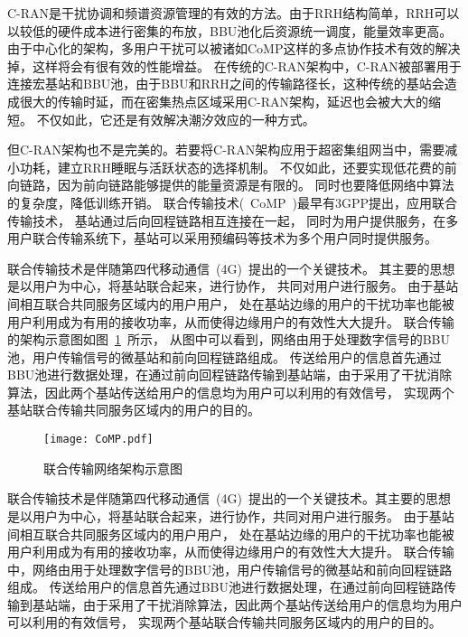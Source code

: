 C-RAN是干扰协调和频谱资源管理的有效的方法。由于RRH结构简单，RRH可以以较低的硬件成本进行密集的布放，BBU池化后资源统一调度，能量效率更高。
由于中心化的架构，多用户干扰可以被诸如CoMP这样的多点协作技术有效的解决掉，这样将会有很有效的性能增益。
在传统的C-RAN架构中，C-RAN被部署用于连接宏基站和BBU池，由于BBU和RRH之间的传输路径长，这种传统的基站会造成很大的传输时延，而在密集热点区域采用C-RAN架构，延迟也会被大大的缩短。
不仅如此，它还是有效解决潮汐效应的一种方式。

但C-RAN架构也不是完美的。若要将C-RAN架构应用于超密集组网当中，需要减小功耗，建立RRH睡眠与活跃状态的选择机制。
不仅如此，还要实现低花费的前向链路，因为前向链路能够提供的能量资源是有限的。
同时也要降低网络中算法的复杂度，降低训练开销。
联合传输技术(~CoMP~)最早有3GPP提出，应用联合传输技术，
基站通过后向回程链路相互连接在一起，
同时为用户提供服务，在多用户联合传输系统下，基站可以采用预编码等技术为多个用户同时提供服务。

联合传输技术是伴随第四代移动通信~(4G)~提出的一个关键技术。
其主要的思想是以用户为中心，将基站联合起来，进行协作，
共同对用户进行服务。
由于基站间相互联合共同服务区域内的用户用户，
处在基站边缘的用户的干扰功率也能被用户利用成为有用的接收功率，从而使得边缘用户的有效性大大提升。
联合传输的架构示意图如图~\ref{CoMP}~所示，
从图中可以看到，网络由用于处理数字信号的BBU池，用户传输信号的微基站和前向回程链路组成。
传送给用户的信息首先通过BBU池进行数据处理，在通过前向回程链路传输到基站端，由于采用了干扰消除算法，因此两个基站传送给用户的信息均为用户可以利用的有效信号，
实现两个基站联合传输共同服务区域内的用户的目的。
\begin{figure}[htbp]
\centering
\texttt{[image: CoMP.pdf]}
\caption{联合传输网络架构示意图}\vspace{-0.5em}
\label{CoMP}
\end{figure}

联合传输技术是伴随第四代移动通信~(4G)~提出的一个关键技术。其主要的思想是以用户为中心，将基站联合起来，进行协作，共同对用户进行服务。
由于基站间相互联合共同服务区域内的用户用户，
处在基站边缘的用户的干扰功率也能被用户利用成为有用的接收功率，从而使得边缘用户的有效性大大提升。
联合传输中，网络由用于处理数字信号的BBU池，用户传输信号的微基站和前向回程链路组成。
传送给用户的信息首先通过BBU池进行数据处理，在通过前向回程链路传输到基站端，由于采用了干扰消除算法，因此两个基站传送给用户的信息均为用户可以利用的有效信号，
实现两个基站联合传输共同服务区域内的用户的目的。

